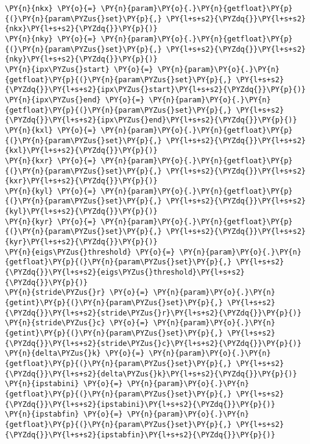 \begin{Verbatim}[commandchars=\\\{\}]
\PY{n}{nkx} \PY{o}{=} \PY{n}{param}\PY{o}{.}\PY{n}{getfloat}\PY{p}{(}\PY{n}{param\PYZus{}set}\PY{p}{,} \PY{l+s+s2}{\PYZdq{}}\PY{l+s+s2}{nkx}\PY{l+s+s2}{\PYZdq{}}\PY{p}{)}
\PY{n}{nky} \PY{o}{=} \PY{n}{param}\PY{o}{.}\PY{n}{getfloat}\PY{p}{(}\PY{n}{param\PYZus{}set}\PY{p}{,} \PY{l+s+s2}{\PYZdq{}}\PY{l+s+s2}{nky}\PY{l+s+s2}{\PYZdq{}}\PY{p}{)}
\PY{n}{ipx\PYZus{}start} \PY{o}{=} \PY{n}{param}\PY{o}{.}\PY{n}{getfloat}\PY{p}{(}\PY{n}{param\PYZus{}set}\PY{p}{,} \PY{l+s+s2}{\PYZdq{}}\PY{l+s+s2}{ipx\PYZus{}start}\PY{l+s+s2}{\PYZdq{}}\PY{p}{)}
\PY{n}{ipx\PYZus{}end} \PY{o}{=} \PY{n}{param}\PY{o}{.}\PY{n}{getfloat}\PY{p}{(}\PY{n}{param\PYZus{}set}\PY{p}{,} \PY{l+s+s2}{\PYZdq{}}\PY{l+s+s2}{ipx\PYZus{}end}\PY{l+s+s2}{\PYZdq{}}\PY{p}{)}
\PY{n}{kxl} \PY{o}{=} \PY{n}{param}\PY{o}{.}\PY{n}{getfloat}\PY{p}{(}\PY{n}{param\PYZus{}set}\PY{p}{,} \PY{l+s+s2}{\PYZdq{}}\PY{l+s+s2}{kxl}\PY{l+s+s2}{\PYZdq{}}\PY{p}{)}
\PY{n}{kxr} \PY{o}{=} \PY{n}{param}\PY{o}{.}\PY{n}{getfloat}\PY{p}{(}\PY{n}{param\PYZus{}set}\PY{p}{,} \PY{l+s+s2}{\PYZdq{}}\PY{l+s+s2}{kxr}\PY{l+s+s2}{\PYZdq{}}\PY{p}{)}
\PY{n}{kyl} \PY{o}{=} \PY{n}{param}\PY{o}{.}\PY{n}{getfloat}\PY{p}{(}\PY{n}{param\PYZus{}set}\PY{p}{,} \PY{l+s+s2}{\PYZdq{}}\PY{l+s+s2}{kyl}\PY{l+s+s2}{\PYZdq{}}\PY{p}{)}
\PY{n}{kyr} \PY{o}{=} \PY{n}{param}\PY{o}{.}\PY{n}{getfloat}\PY{p}{(}\PY{n}{param\PYZus{}set}\PY{p}{,} \PY{l+s+s2}{\PYZdq{}}\PY{l+s+s2}{kyr}\PY{l+s+s2}{\PYZdq{}}\PY{p}{)}
\PY{n}{eigs\PYZus{}threshold} \PY{o}{=} \PY{n}{param}\PY{o}{.}\PY{n}{getfloat}\PY{p}{(}\PY{n}{param\PYZus{}set}\PY{p}{,} \PY{l+s+s2}{\PYZdq{}}\PY{l+s+s2}{eigs\PYZus{}threshold}\PY{l+s+s2}{\PYZdq{}}\PY{p}{)}
\PY{n}{stride\PYZus{}r} \PY{o}{=} \PY{n}{param}\PY{o}{.}\PY{n}{getint}\PY{p}{(}\PY{n}{param\PYZus{}set}\PY{p}{,} \PY{l+s+s2}{\PYZdq{}}\PY{l+s+s2}{stride\PYZus{}r}\PY{l+s+s2}{\PYZdq{}}\PY{p}{)}
\PY{n}{stride\PYZus{}c} \PY{o}{=} \PY{n}{param}\PY{o}{.}\PY{n}{getint}\PY{p}{(}\PY{n}{param\PYZus{}set}\PY{p}{,} \PY{l+s+s2}{\PYZdq{}}\PY{l+s+s2}{stride\PYZus{}c}\PY{l+s+s2}{\PYZdq{}}\PY{p}{)}
\PY{n}{delta\PYZus{}k} \PY{o}{=} \PY{n}{param}\PY{o}{.}\PY{n}{getfloat}\PY{p}{(}\PY{n}{param\PYZus{}set}\PY{p}{,} \PY{l+s+s2}{\PYZdq{}}\PY{l+s+s2}{delta\PYZus{}k}\PY{l+s+s2}{\PYZdq{}}\PY{p}{)}
\PY{n}{ipstabini} \PY{o}{=} \PY{n}{param}\PY{o}{.}\PY{n}{getfloat}\PY{p}{(}\PY{n}{param\PYZus{}set}\PY{p}{,} \PY{l+s+s2}{\PYZdq{}}\PY{l+s+s2}{ipstabini}\PY{l+s+s2}{\PYZdq{}}\PY{p}{)}
\PY{n}{ipstabfin} \PY{o}{=} \PY{n}{param}\PY{o}{.}\PY{n}{getfloat}\PY{p}{(}\PY{n}{param\PYZus{}set}\PY{p}{,} \PY{l+s+s2}{\PYZdq{}}\PY{l+s+s2}{ipstabfin}\PY{l+s+s2}{\PYZdq{}}\PY{p}{)}



\end{Verbatim}
